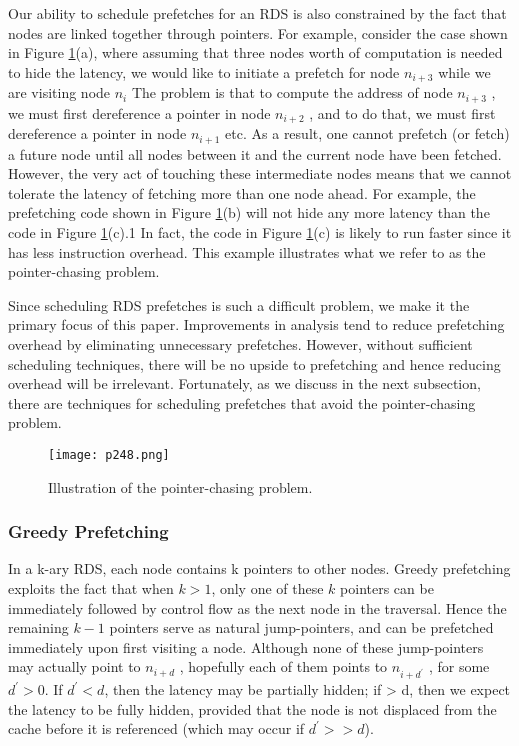 Our ability to schedule prefetches for an RDS is also constrained
by the fact that nodes are linked together through pointers. For
example, consider the case shown in Figure \ref{fig:p248}(a), where assuming
that three nodes worth of computation is needed to hide the
latency, we would like to initiate a prefetch for node $n_{i+3}$  while
we are visiting node $n_i$ The problem is that to compute the
address of node $n_{i+3}$ , we must first dereference a pointer in node
$n_{i+2}$ , and to do that, we must first dereference a pointer in node
$n_{i+1}$  etc. As a result, one cannot prefetch (or fetch) a future
node until all nodes between it and the current node have been
fetched. However, the very act of touching these intermediate
nodes means that we cannot tolerate the latency of fetching more
than one node ahead. For example, the prefetching code shown
in Figure \ref{fig:p248}(b) will not hide any more latency than the code in
Figure \ref{fig:p248}(c).1 In fact, the code in Figure \ref{fig:p248}(c) is likely to run faster
since it has less instruction overhead. This example illustrates
what we refer to as the pointer-chasing problem.

Since scheduling RDS prefetches is such a difficult problem, we
make it the primary focus of this paper. Improvements in analysis tend to reduce prefetching overhead by eliminating unnecessary prefetches. However, without sufficient scheduling techniques, there will be no upside to prefetching and hence reducing
overhead will be irrelevant. Fortunately, as we discuss in the
next subsection, there are techniques for scheduling prefetches
that avoid the pointer-chasing problem.



\begin{figure}[H]
    \centering
    \texttt{[image: p248.png]}
    \caption{Illustration of the pointer-chasing problem.  }
    \label{fig:p248}
\end{figure}


\subsubsection{Greedy Prefetching}

In a k-ary RDS, each node contains k pointers to other nodes.
Greedy prefetching exploits the fact that when $k > 1$, only one
of these $k$ pointers can be immediately followed by control flow
as the next node in the traversal. Hence the remaining $k - 1$
pointers serve as natural jump-pointers, and can be prefetched
immediately upon first visiting a node. Although none of these
jump-pointers may actually point to $n_{i+d}$ , hopefully each of them
points to $n_{i+d^{\prime}}$ , for some $d^{\prime}  > 0$. If $d^{\prime} < d$, then the latency may
be partially hidden; if  > d, then we expect the latency to be
fully hidden, provided that the node is not displaced from the
cache before it is referenced (which may occur if $d^{\prime} >> d$).

